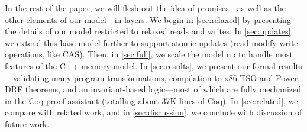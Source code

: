 



In the rest of the paper, we will flesh out the idea of promises---as
well as the other elements of our model---in layers.  We begin in
\cref{sec:relaxed} by presenting the details of our model restricted
to relaxed reads and writes.  In \cref{sec:updates}, we extend this
base model further to support atomic updates (\ie read-modify-write
operations, like CAS).  Then, in \cref{sec:full}, we scale the model
up to handle most features of the C++ memory model.  In
\cref{sec:results}, we present our formal results---validating many
program transformations, compilation to x86-TSO and Power, DRF
theorems, and an invariant-based logic---most of which are fully
mechanized in the Coq proof assistant (totalling about 37K lines of
Coq).  In \cref{sec:related}, we compare with related work, and in
\cref{sec:discussion}, we conclude with discussion of future work.


